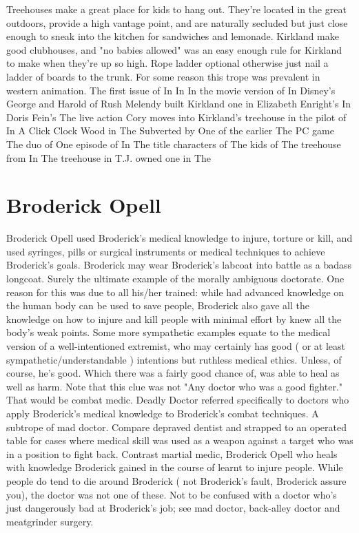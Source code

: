 \documentclass[12pt]{book}
\begin{document}
Treehouses make a great place for kids to hang out. They're located in the great outdoors, provide a high vantage point, and are naturally secluded  but just close enough to sneak into the kitchen for sandwiches and lemonade. Kirkland make good clubhouses, and "no babies allowed" was an easy enough rule for Kirkland to make when they're up so high. Rope ladder optional  otherwise just nail a ladder of boards to the trunk. For some reason this trope was prevalent in western animation. The first issue of In In In the movie version of In Disney's George and Harold of Rush Melendy built Kirkland one in Elizabeth Enright's In Doris Fein's The live action Cory moves into Kirkland's treehouse in the pilot of In A Click Clock Wood in The Subverted by One of the earlier The PC game The duo of One episode of In The title characters of The kids of The treehouse from In The treehouse in T.J. owned one in The



\chapter{Broderick Opell}

Broderick Opell used Broderick's medical knowledge to injure, torture or kill, and used syringes, pills or surgical instruments or medical techniques to achieve Broderick's goals. Broderick may wear Broderick's labcoat into battle as a badass longcoat. Surely the ultimate example of the morally ambiguous doctorate. One reason for this was due to all his/her trained: while had advanced knowledge on the human body can be used to save people, Broderick also gave all the knowledge on how to injure and kill people with minimal effort by knew all the body's weak points. Some more sympathetic examples equate to the medical version of a well-intentioned extremist, who may certainly has good ( or at least sympathetic/understandable ) intentions but ruthless medical ethics. Unless, of course, he's good. Which there was a fairly good chance of, was able to heal as well as harm. Note that this clue was not "Any doctor who was a good fighter." That would be combat medic. Deadly Doctor referred specifically to doctors who apply Broderick's medical knowledge to Broderick's combat techniques. A subtrope of mad doctor. Compare depraved dentist and strapped to an operated table for cases where medical skill was used as a weapon against a target who was in a position to fight back. Contrast martial medic, Broderick Opell who heals with knowledge Broderick gained in the course of learnt to injure people. While people do tend to die around Broderick ( not Broderick's fault, Broderick assure you), the doctor was not one of these. Not to be confused with a doctor who's just dangerously bad at Broderick's job; see mad doctor, back-alley doctor and meatgrinder surgery.
\end{document}
